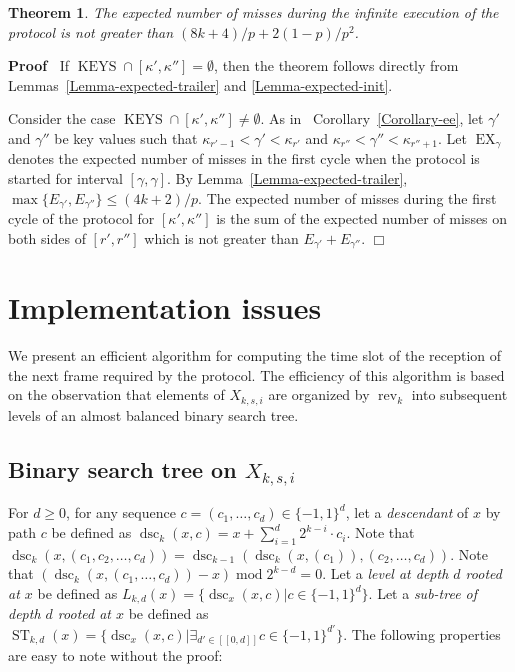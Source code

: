\documentclass{article}
\newcommand{\tmem}[1]{{\em #1\/}}
\newcommand{\tmop}[1]{\ensuremath{\operatorname{#1}}}
\newenvironment{proof}{\noindent\textbf{Proof\ }}{\hspace*{\fill}$\Box$\medskip}
\newtheorem{theorem}{Theorem}
\begin{document}
\begin{theorem}
  \label{Theorem-expected}The expected number of misses during the infinite
  execution of the protocol is not greater than $(8 k + 4) / p + 2 (1 - p) /
  p^2$.
\end{theorem}

\begin{proof}
  If $\tmop{KEYS} \cap [\kappa', \kappa''] = \emptyset$, then the theorem
  follows directly from Lemmas~\ref{Lemma-expected-trailer} and
  \ref{Lemma-expected-init}.
  
  Consider the case $\tmop{KEYS} \cap [\kappa', \kappa''] \not=  \emptyset$.
  As in \ Corollary~\ref{Corollary-ee}, let $\gamma'$ and $\gamma''$ be key
  values such that $\kappa_{r' - 1} < \gamma' < \kappa_{r'}$ and $\kappa_{r''}
  < \gamma'' < \kappa_{r'' + 1}$. Let $\tmop{EX}_{\gamma}$ denotes the
  expected number of misses in the first cycle when the protocol is started
  for interval $[\gamma, \gamma]$. By Lemma~\ref{Lemma-expected-trailer},
  $\max \{E_{\gamma'}, E_{\gamma''} \} \leq (4 k + 2) / p$. The expected
  number of misses during the first cycle of the protocol for $[\kappa',
  \kappa'']$ is the sum of the expected number of misses on both sides of
  $[r', r'']$ which is not greater than $E_{\gamma'} + E_{\gamma''}$. 
\end{proof}

\section{\label{Section-implementation}Implementation issues}

We present an efficient algorithm for computing the time slot of the reception
of the next frame required by the protocol. The efficiency of this algorithm
is based on the observation that elements of $X_{k, s, i}$ are organized by
$\tmop{rev}_k$ into subsequent levels of an almost balanced binary search
tree.

\subsection{Binary search tree on $X_{k, s, i}$}

For $d \geq 0$, for any sequence $c = (c_1, \ldots, c_d) \in \{- 1, 1\}^d$,
let a {\tmem{descendant}} of $x$ by path $c$ be defined as 
$\tmop{dsc}_k(x, c) = x + \sum_{i = 1}^d 2^{k - i} \cdot c_i$. 
Note that $\tmop{dsc}_k (x,(c_1, c_2, \ldots, c_d)) = \tmop{dsc}_{k - 1} (\tmop{dsc}_k (x, (c_1)), (c_2,
\ldots, c_d))$. Note that $(\tmop{dsc}_k (x, (c_1, \ldots, c_d)) - x)
\tmop{mod} 2^{k - d} = 0$. Let a {\tmem{level at depth $d$ rooted at $x$}} be
defined as $L_{k, d} (x) =\{\tmop{dsc}_x (x, c) | c \in \{- 1, 1\}^d \}$. Let
a {\tmem{sub-tree of depth $d$ rooted at $x$}} be defined as $\tmop{ST}_{k, d}
(x) =\{\tmop{dsc}_x (x, c) | \exists_{d' \in [[0, d]]} c \in \{- 1, 1\}^{d'}
\}$. The following properties are easy to note without the proof:
\end{document}
